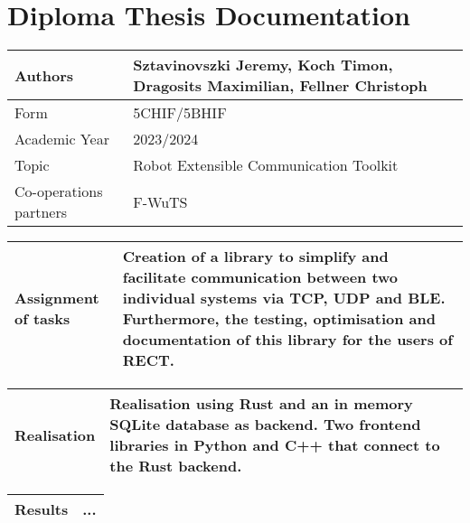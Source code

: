 \chapter{Diploma Thesis Documentation}
\begin{center}
    \begin{tabular}{| m{8cm} | m{8cm} |}
        \hline
        Authors & Sztavinovszki Jeremy, Koch Timon, Dragosits Maximilian, Fellner Christoph\\
        \hline
        Form & 5CHIF/5BHIF\\
        Academic Year & 2023/2024\\
        \hline
        Topic & Robot Extensible Communication Toolkit\\
        \hline
        Co-operations partners & F-WuTS\\
        \hline
    \end{tabular}
    
    \vspace{5mm}
    
    \begin{tabular}{| m{8cm} | m{8cm} |}
        \hline
        Assignment of tasks & Creation of a library to simplify and facilitate communication between two individual systems via TCP, UDP and BLE. Furthermore, the testing, optimisation and documentation of this library for the users of RECT.\\ %
        \hline
    \end{tabular}
    
    \vspace{5mm}
    
    \begin{tabular}{| m{8cm} | m{8cm} |}
        \hline
        Realisation & Realisation using Rust and an in memory SQLite database as backend. Two frontend libraries in Python and C++ that connect to the Rust backend.\\ %
        \hline
    \end{tabular}
    
    \vspace{5mm}
    
    \begin{tabular}{| m{8cm} | m{8cm} |}
        \hline
        Results & ...\\ %
        \hline
    \end{tabular}
    

\end{center}
